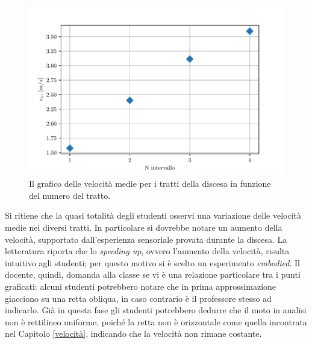 \documentclass{report} \usepackage[T1]{fontenc} \usepackage[italian]{babel}
\begin{document}
\begin{figure}[H]
\centering
  \includegraphics[width=\textwidth]{v-N_tratto}
  \caption{Il grafico delle velocità medie per i tratti della
           discesa in funzione del numero del tratto.}
  \label{fig:v-N_tratto}
\end{figure}

Si ritiene che la quasi totalità degli
studenti osservi una variazione delle velocità medie nei diversi tratti. In
particolare si dovrebbe notare  un aumento della velocità, supportato
dall'esperienza sensoriale
provata durante la discesa. La letteratura
riporta che lo \emph{speeding up}, ovvero l'aumento della velocità,
risulta intuitivo agli studenti\cite{trowbridge1981investigation};
per questo motivo si è scelto un esperimento \emph{embodied}.
Il docente, quindi, domanda alla classe se vi è una
relazione particolare tra i punti graficati: alcuni studenti potrebbero notare
che in prima approssimazione giacciono su una retta obliqua,
in caso contrario è il professore stesso ad indicarlo.
Già in questa fase gli studenti potrebbero dedurre che il moto in analisi non è
rettilineo uniforme, poiché la retta non è orizzontale come quella incontrata
nel Capitolo \ref{velocità}, indicando che la velocità non rimane costante.
\end{document}
